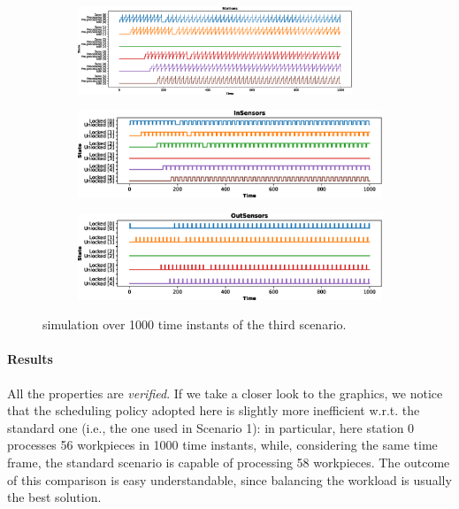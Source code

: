 \documentclass[a4paper,twoside]{article}
\begin{document}
    \begin{figure}[h!]
        \begin{subfigure}{\textwidth}
            \centering
            \includegraphics[width=0.9\textwidth]{images/scenarios/scenario3_stations}
        \end{subfigure}
        \begin{subfigure}{0.49\textwidth}
            \centering
            \includegraphics[width=\textwidth]{images/scenarios/scenario3_insensors}
        \end{subfigure}
        \hfill
        \begin{subfigure}{0.49\textwidth}
            \centering
            \includegraphics[width=\textwidth]{images/scenarios/scenario3_outsensors}
        \end{subfigure}
        \caption{simulation over 1000 time instants of the third scenario.}
        \label{figure:scenario:3}
    \end{figure}

    \paragraph{Results} All the properties are \textit{verified}. If we take a closer look to the graphics, we notice that the scheduling policy adopted here is slightly more inefficient w.r.t. the standard one (i.e., the one used in Scenario 1): in particular, here station 0 processes 56 workpieces in 1000 time instants, while, considering the same time frame, the standard scenario is capable of processing 58 workpieces. The outcome of this comparison is easy understandable, since balancing the workload is usually the best solution.
\end{document}
